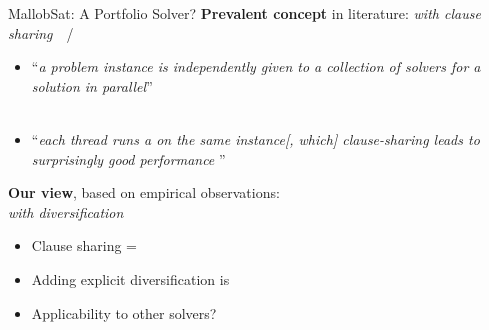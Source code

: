 \documentclass[t,english]{sdqbeamer}
\begin{document}
\begin{frame}{MallobSat: A Portfolio Solver?}
	\textbf{Prevalent concept} in literature:  \textit{with clause sharing}\ \ /\ \ 
	\begin{itemize}
		\item ``\textit{a problem instance is independently given to a collection of solvers  for a solution in parallel}''\\\hfill{}~\cite{fichte2023silent}
		\item ``\textit{each thread runs a  on the same instance[, which]  clause-sharing leads to surprisingly good performance }''\hfill{}~\cite{ozdemir2021sat}
	\end{itemize}
	
	\pause
	\vspace*{10mm}
	\textbf{Our view}, based on empirical observations:\\[2mm]
	 \textit{with diversification}
	\begin{itemize}
		\item Clause sharing = 
		\item Adding explicit diversification is 
		\item Applicability to other solvers?
	\end{itemize}
\end{frame}
\end{document}
